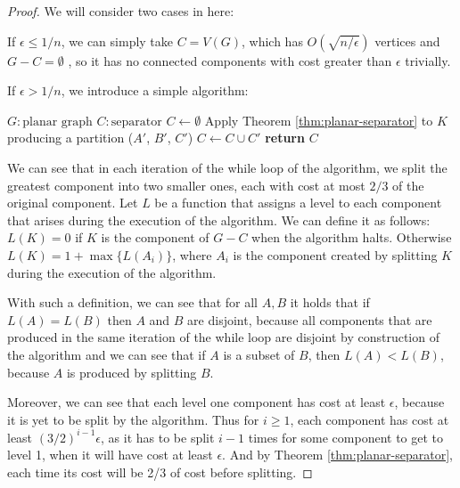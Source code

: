 \begin{proof}
	We will consider two cases in here:

	If $\epsilon \leq 1 / n $, we can simply take $C = V(G)$,
	which has $O(\sqrt{n/ \epsilon})$ vertices and $G - C = \emptyset$ , so it
	has no connected components with cost greater than $\epsilon$ trivially.

	If $\epsilon > 1 / n$, we introduce a simple algorithm:
	\begin{algorithm}[H]\caption{Finding $\epsilon$-planar separator}\label{alg:epsilon-planar-separator}
		\begin{algorithmic}[1]
            \Require $G \colon \text{planar graph}$
            \Ensure $C \colon \text{separator}$
			\State $C \gets \emptyset$
			\State Apply Theorem \ref{thm:planar-separator} to $K$ producing
			a partition ($A'$, $B'$, $C'$)
			\State $C \gets C \cup C'$
			\EndWhile
			\State \textbf{return} $C$
		\end{algorithmic}
	\end{algorithm}

	We can see that in each iteration of the while loop of the algorithm, we
	split the greatest component into two smaller ones, each with cost at
	most $2/3$ of the original component.
	Let $L$ be a function that assigns a level to each
	component that arises during the execution of the algorithm. We can
	define it as follows: $L(K) = 0$ if $K$ is the component of $G - C$
    when the algorithm halts. Otherwise $L(K) = 1 + \max\{L(A_i)\}$, where $A_i$ is the component created by splitting $K$ during the execution of
	the algorithm.

    With such a definition, we can see that for all $A, B$ it holds that 
    if $L(A) = L(B)$ then $A$ and $B$ are disjoint, because all components that are
	produced in the same iteration of the while loop are disjoint by construction of the algorithm and we can see that if $A$ is a subset of $B$, then $L(A) < L(B)$, because $A$ is produced by splitting $B$.

	Moreover, we can see that each level one component has cost at least $\epsilon$,
	because it is yet to be split by the algorithm. Thus for $i \geq 1$, each
	component has cost at least $(3/2)^{i-1} \epsilon$, as it has to be split $i-1$ times for some component to get to level 1, when it will have cost at least $\epsilon$.
	And by Theorem \ref{thm:planar-separator}, each time its cost will be 2/3
	of cost before splitting.


\end{proof}
